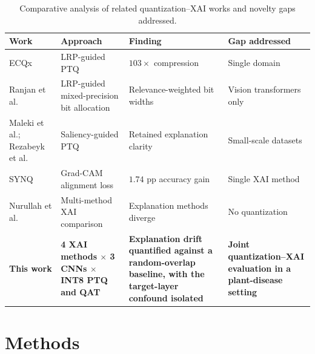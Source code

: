 \documentclass[fleqn,10pt]{wlscirep}
\begin{document}
\begin{table}[!ht]
\centering
\scriptsize
\setlength{\tabcolsep}{3.2pt}
\renewcommand{\arraystretch}{1.05}
\caption{Comparative analysis of related quantization--XAI works and novelty gaps addressed.}
\label{tab:lit_review}
\begin{tabular}{@{}p{2.0cm}p{3.6cm}p{4.2cm}p{3.4cm}@{}}
\toprule
\textbf{Work} & \textbf{Approach} & \textbf{Finding} & \textbf{Gap addressed} \\
\midrule
ECQx\cite{Becking2022ecqx} & LRP-guided PTQ & $103\times$ compression & Single domain \\
\addlinespace
Ranjan et al.\cite{Ranjan2024lrpqvit,Ranjan2025mixqvit} & LRP-guided mixed-precision bit allocation & Relevance-weighted bit widths & Vision transformers only \\
\addlinespace
Maleki et al.; Rezabeyk et al.\cite{Maleki2024quantized,Rezabeyk2024saliency} & Saliency-guided PTQ & Retained explanation clarity & Small-scale datasets \\
\addlinespace
SYNQ\cite{Kim2025synq} & Grad-CAM alignment loss & $1.74$ pp accuracy gain & Single XAI method \\
\addlinespace
Nurullah et al.\cite{Nurullah2025tomato} & Multi-method XAI comparison & Explanation methods diverge & No quantization \\
\midrule
\textbf{This work} & \textbf{4 XAI methods $\times$ 3 CNNs $\times$ INT8 PTQ and QAT} & \textbf{Explanation drift quantified against a random-overlap baseline, with the target-layer confound isolated} & \textbf{Joint quantization--XAI evaluation in a plant-disease setting} \\
\bottomrule
\end{tabular}
\end{table}

\vspace{-6pt}

\section*{Methods}
\end{document}
